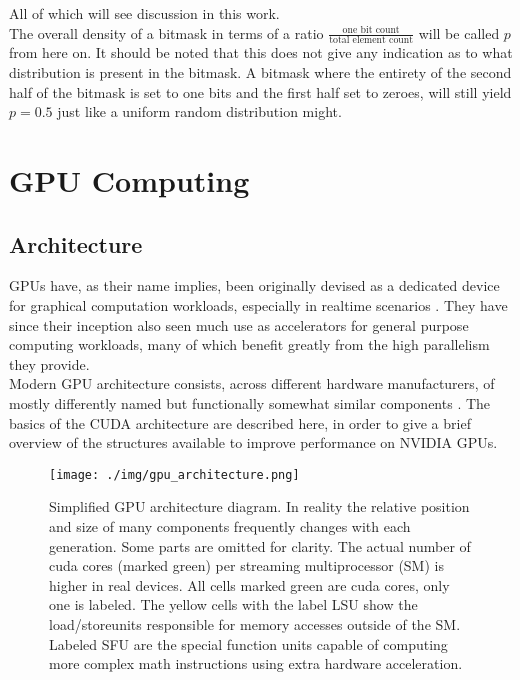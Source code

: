 \documentclass{tudscrreprt}
\begin{document}
			All of which will see discussion in this work. \\
			The overall density of a bitmask in terms of a ratio $\frac{\text{one bit count}}{\text{total element count}}$ will be called $p$ from here on. It should be noted that this does not give any indication as to what distribution is present in the bitmask. A bitmask where the entirety of the second half of the bitmask is set to one bits and the first half set to zeroes, will still yield $p=0.5$ just like a uniform random distribution might. \\
		
		\section{GPU Computing}
			\subsection{Architecture}
				GPUs have, as their name implies, been originally devised as a dedicated device for graphical computation workloads, especially in realtime scenarios \cite{cuda_arch}. They have since their inception also seen much use as accelerators for general purpose computing workloads, many of which benefit greatly from the high parallelism they provide. \\
				Modern GPU architecture consists, across different hardware manufacturers, of mostly differently named but functionally somewhat similar components \cite{nvidia_vs_amd_arch}. The basics of the CUDA architecture are described here, in order to give a brief overview of the structures available to improve performance on NVIDIA GPUs. \\
				
				\begin{figure}[!ht]
					\centering
					\texttt{[image: ./img/gpu\_architecture.png]}
					\caption{\label{fig:gpu_architecture}Simplified GPU architecture diagram. In reality the relative position and size of many components frequently changes with each generation. Some parts are omitted for clarity. The actual number of cuda cores (marked green) per streaming multiprocessor (SM) is higher in real devices. All cells marked green are cuda cores, only one is labeled. The yellow cells with the label LSU show the load/storeunits responsible for memory accesses outside of the SM. Labeled SFU are the special function units capable of computing more complex math instructions using extra hardware acceleration.}
				\end{figure}
				
\end{document}
